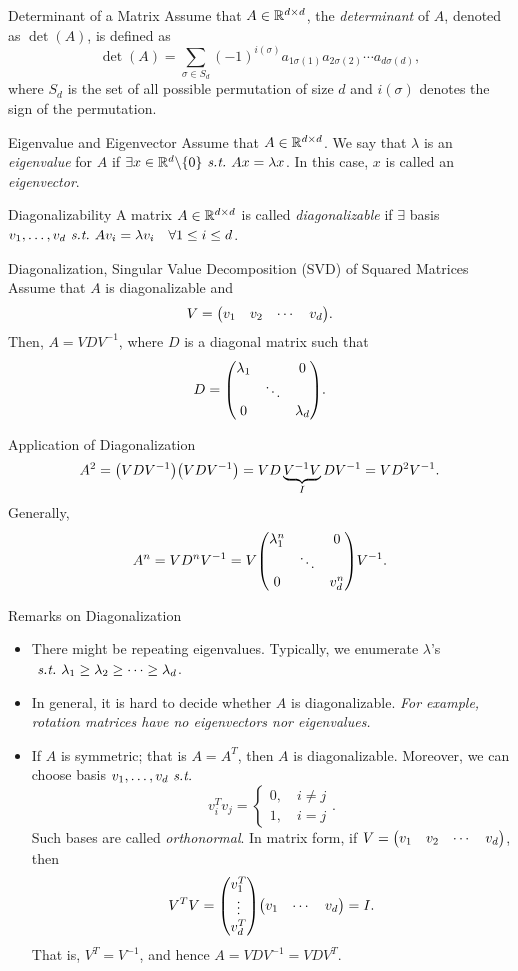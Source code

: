 \begin{df}{Determinant of a Matrix}
	Assume that $A\in{\mathbb{R}}^{d\times d}$, the \textit{determinant} of $A$, denoted as $\det(A)$, is defined as \[\det(A)=\sum_{\sigma\in S_d}(-1)^{i(\sigma)}a_{1\sigma(1)}a_{2\sigma(2)}\cdots a_{d\sigma(d)},\] where $S_d$ is the set of all possible permutation of size $d$ and $i(\sigma)$ denotes the sign of the permutation. 
\end{df}
\begin{df}{Eigenvalue and Eigenvector}
	Assume that	$A\in{\mathbb{R}}^{d\times d}$. We say that $\lambda$ is an \textit{eigenvalue} for $A$ if $\exists x\in{\mathbb{R}}^d\backslash\qty{0}\emph{\ s.t.\ } Ax=\lambda x$. In this case, $x$ is called an \textit{eigenvector}.
\end{df}
\begin{df}{Diagonalizability}
	A matrix $A\in{\mathbb{R}}^{d\times d}$ is called \textit{diagonalizable} if $\exists$ basis $v_1,\dots,v_d\emph{\ s.t.\ } Av_i=\lambda v_i\quad\forall1\leq i\leq d$. 
\end{df}
\begin{thm}{Diagonalization, Singular Value Decomposition (SVD) of Squared Matrices}
	Assume that $A$ is diagonalizable and \[V=\mqty(v_1&v_2&\cdots&v_d).\] Then, $A=VDV^{-1}$, where $D$ is a diagonal matrix such that \[D=\mqty(\lambda_1&&0\\&\ddots&\\0&&\lambda_d).\]
\end{thm}
\begin{eg}{Application of Diagonalization}
	\[A^2=\qty(VDV^{-1})\qty(VDV^{-1})=VD\underbrace{V^{-1}V}_IDV^{-1}=VD^2V^{-1}.\] Generally, \[A^n=VD^nV^{-1}=V\mqty(\lambda_1^n&&0\\&\ddots&\\0&&v_d^n)V^{-1}.\]
\end{eg}
\begin{rmk} Remarks on Diagonalization
	\begin{itemize}
		\item There might be repeating eigenvalues. Typically, we enumerate $\lambda$'s $\emph{\ s.t.\ }\lambda_1\geq\lambda_2\geq\cdots\geq\lambda_d$.
		\item In general, it is hard to decide whether $A$ is diagonalizable. \emph{For example, rotation matrices have no eigenvectors nor eigenvalues.}
		\item If $A$ is symmetric; that is $A=A^T$, then $A$ is diagonalizable. Moreover, we can choose basis $v_1,\dots,v_d \emph{\ s.t.\ }$ \[v_i^Tv_j=\begin{cases}0,\quad i\neq j\\1,\quad i=j\end{cases}.\] Such bases are called \emph{orthonormal}. In matrix form, if $V=\mqty(v_1&v_2&\cdots&v_d)$, then \[V^TV=\mqty(v_1^T\\\vdots\\v_d^T)\mqty(v_1&\cdots&v_d)=I.\] That is, $V^T=V^{-1}$, and hence $A=VDV^{-1}=VDV^{T}$.
	\end{itemize}	
\end{rmk}

